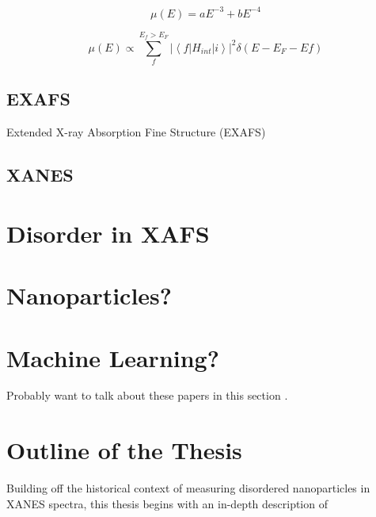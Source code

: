 \begin{equation}
    \label{Victoreen}
    \mu(E) = aE^{-3} + bE^{-4}
\end{equation}

\begin{equation}
    \label{FermisGoldenRule}
    \mu(E) \varpropto \sum_{f}^{E_f > E_F} \left\lvert \left\langle f \lvert H_{int} \rvert i \right\rangle \right\rvert ^2 \delta (E - E_F - Ef)  
\end{equation}

\subsection{EXAFS}
Extended X-ray Absorption Fine Structure (EXAFS)


\subsection{XANES}

\section{Disorder in XAFS}

\section{Nanoparticles?}
\section{Machine Learning?}

Probably want to talk about these papers in this section \cite{timoshenko2018neural} \cite{Timoshenko2017}.
\section{Outline of the Thesis}
Building off the historical context of measuring disordered nanoparticles in XANES spectra, this thesis begins with an in-depth description of 
